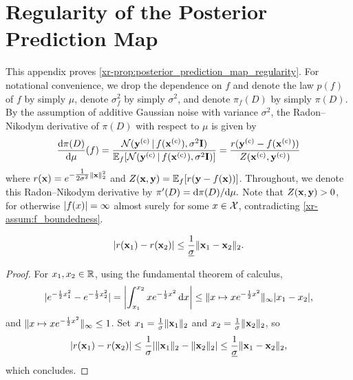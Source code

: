 \documentclass[12pt]{report}
\newcommand{\xrprefix}[1]{xr-#1}
\begin{document}
\chapter
    [Regularity of the Posterior Prediction Map]
    {Regularity of the \tnl Posterior Prediction Map}
\label{app:regularity}

This appendix proves \cref{\xrprefix{prop:posterior_prediction_map_regularity}}.
For notational convenience, we drop the dependence on $f$ and denote the law $p(f)$ of $f$ by simply $\mu$, denote $\sigma^2_f$ by simply $\sigma^2$, and denote $\pi_f(D)$ by simply $\pi(D)$.
By the assumption of additive Gaussian noise with variance $\sigma^2$, the Radon--Nikodym derivative of $\pi(D)$ with respect to $\mu$ is given by
\begin{equation}
    \frac{\sd \pi(D)}{\sd \mu}(f)
    =
    \frac
        {\Normal(\vy\us{(c)} \cond f(\vx\us{(c)}), \sigma^2 \mI)}
        {\E_f[\Normal(\vy\us{(c)} \cond f(\vx\us{(c)}), \sigma^2 \mI)]}
    =
    \frac
        {r(\vy\us{(c)} - f(\vx\us{(c)}))}
        {Z(\vx\us{(c)}, \vy\us{(c)})}
\end{equation}
where $r(\vx) = e^{-\tfrac{1}{2\sigma^2}\norm{\vx}_2^2}$
and $Z(\vx, \vy) = \E_f[r(\vy - f(\vx))]$.
Throughout, we denote this Radon--Nikodym derivative by
$
    \pi'(D) = \sd \pi(D)/ \sd \mu.
$
Note that $Z(\vx, \vy) > 0$, for otherwise $\abs{f(x)} = \infty$ almost surely for some $x \in \X$, contradicting \cref{\xrprefix{assum:f_boundedness}}.

\begin{lemma} \label{lem:local_Lipschitzness_r}
    \begin{equation}
        \abs{r(\vx_1) - r(\vx_2)} \le \frac{1}{\underline{\sigma}}\norm{\vx_1 - \vx_2}_2.
    \end{equation}
\end{lemma}
\begin{proof}
    For $x_1, x_2 \in \R$, using the fundamental theorem of calculus,
    \begin{equation}
        \abs{e^{-\frac12 x_1^2} - e^{-\frac12 x_2^2}} = \abs*{
            \int_{x_1}^{x_2} x e^{-\frac12 x^2} \isd x
        }
        \le \norm{x \mapsto x e^{-\frac12 x^2}}_\infty \abs{x_1 - x_2},
    \end{equation}
    and $\norm{x \mapsto x e^{-\frac12 x^2}}_\infty \le 1$.
    Set $x_1 = \frac1{\sigma}\norm{\vx_1}_2$ and $x_2 = \frac1{\sigma}\norm{\vx_2}_2$,
    so
    \begin{equation}
        \abs{r(\vx_1) - r(\vx_2)}
        \le \frac{1}{\sigma} \abs{\norm{\vx_1}_2 - \norm{\vx_2}_2}
        \le \frac{1}{\underline{\sigma}} \norm{\vx_1 - \vx_2}_2,
    \end{equation}
    which concludes.  
\end{proof}
\end{document}
